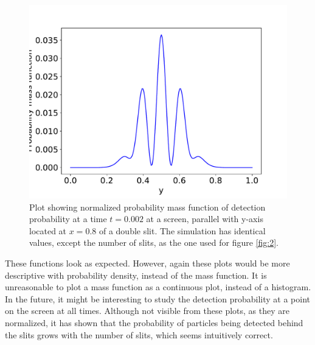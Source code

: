 \documentclass[english,notitlepage,reprint,nofootinbib]{revtex4-1}  %
\begin{document}
\begin{figure}[h!]
    \centering %
    \includegraphics[scale=0.35]{figures/1D_2.pdf} %
    \caption{Plot showing normalized probability mass function of detection probability at a time $t=0.002$ at a screen, parallel with y-axis located at $x=0.8$ of a double slit. The simulation has identical values, except the number of slits, as the one used for figure \ref{fig:2}.}
    \label{fig:12}
\end{figure}
\FloatBarrier


These functions look as expected. However, again these plots would be more descriptive with probability density, instead of the mass function. It is unreasonable to plot a mass function as a continuous plot, instead of a histogram. In the future, it might be interesting to study the detection probability at a point on the screen at all times. Although not visible from these plots, as they are normalized, it has shown that the probability of particles being detected behind the slits grows with the number of slits, which seems intuitively correct.
\end{document}
